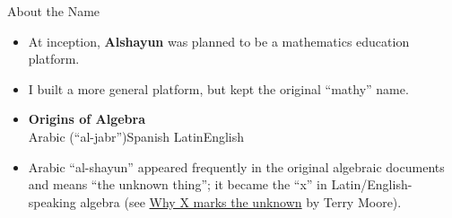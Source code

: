 \documentclass{beamer}
\begin{document}
\begin{frame}{About the Name}
    \begin{itemize}
        \item At inception, \textbf{Alshayun} was planned to be a mathematics
            education platform.
        \item I built a more general platform, but kept the original ``mathy'' name.
        \item
            \begin{center}
                \textbf{Origins of Algebra} \\
                Arabic (``al-jabr'')\textrightarrow Spanish\textrightarrow
                Latin\textrightarrow English
            \end{center}
        \item Arabic ``al-shayun'' appeared frequently in the original algebraic
            documents and means ``the unknown thing''; it became the ``x'' in
            Latin/English-speaking algebra (see
            \href{https://cosmosmagazine.com/mathematics/why-x-marks-unknown-0}{Why
            X marks the unknown} by Terry Moore).
    \end{itemize}
\end{frame}
\end{document}
